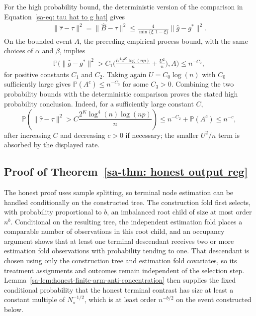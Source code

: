 \documentclass[10pt]{article}
\def\P{\mathbb{P}}
\theoremstyle{definition}
\theoremstyle{remark}
\begin{document}
For the high probability bound, the deterministic version of the comparison in Equation~\eqref{sa-eq: tau hat to g hat} gives
\begin{align*}
    \lVert \hat{\tau} - \tau \rVert^2
    = \lVert \hat{B} - \tau \rVert^2 
    \leq \frac{4}{\min\{\xi, 1 - \xi\}} \lVert \hat{g} - g^{\ast} \rVert^2.
\end{align*}
On the bounded event $A$, the preceding empirical process bound, with the same choices of $\alpha$ and $\beta$, implies
\begin{align*}
    \P\bigg(\lVert \hat{g} - g^{\ast}\rVert^2
    > C_1 \bigg(\frac{U^4 2^K \log(np)}{n} + \frac{U^2}{n} \bigg), A\bigg)
    \leq n^{-C_2},
\end{align*}
for positive constants $C_1$ and $C_2$. Taking again $U=C_0\log(n)$ with $C_0$ sufficiently large gives $\P(A^c)\leq n^{-C_3}$ for some $C_3>0$. Combining the two probability bounds with the deterministic comparison proves the stated high probability conclusion.
Indeed, for a sufficiently large constant $C$,
\[
    \P\!\left(
    \lVert \hat{\tau}-\tau\rVert^2
    >
    C\frac{2^K\log^4(n)\log(np)}{n}
    \right)
    \leq n^{-C_2}+\P(A^c)
    \leq n^{-c},
\]
after increasing $C$ and decreasing $c>0$ if necessary; the smaller $U^2/n$ term is absorbed by the displayed rate.

\subsection{Proof of Theorem~\ref{sa-thm: honest output reg}}

The honest proof uses sample splitting, so terminal node estimation can be handled conditionally on the constructed tree. The construction fold first selects, with probability proportional to $b$, an imbalanced root child of size at most order $n^b$. Conditional on the resulting tree, the independent estimation fold places a comparable number of observations in this root child, and an occupancy argument shows that at least one terminal descendant receives two or more estimation fold observations with probability tending to one. That descendant is chosen using only the construction tree and estimation fold covariates, so its treatment assignments and outcomes remain independent of the selection step. Lemma~\ref{sa-lem:honest-finite-arm-anti-concentration} then supplies the fixed conditional probability that the honest terminal contrast has size at least a constant multiple of $N_\star^{-1/2}$, which is at least order $n^{-b/2}$ on the event constructed below.
\end{document}
